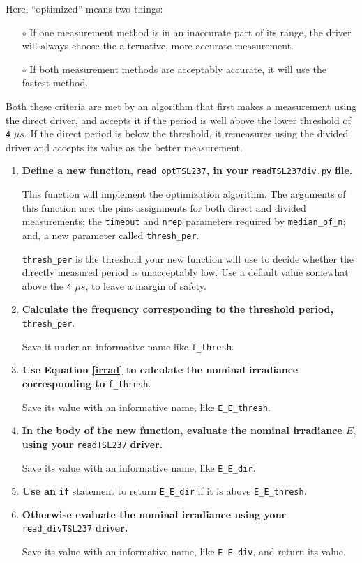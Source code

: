 Here, ``optimized'' means two things:
\begin{itemize}
	\item[$\circ$] If one measurement method is in an inaccurate part of its range, the driver will always choose the alternative, more accurate measurement.
	\item[$\circ$] If both measurement methods are acceptably accurate, it will use the fastest method.
\end{itemize} 
Both these criteria are met by an algorithm that first makes a measurement using the direct driver, and accepts it if the period is well above the lower threshold of \texttt{4} $\mu s$.
If the direct period is below the threshold, it remeasures using the divided driver and accepts its value as the better measurement.
\begin{enumerate}
	\item \textbf{Define a new function,} \lstinline{read_optTSL237}\textbf{, in your} \lstinline{readTSL237div.py} \textbf{file.}
	
	This function will implement the optimization algorithm.
	The arguments of this function are: the pins assignments for both direct and divided measurements; the \lstinline{timeout} and \lstinline{nrep} parameters required by \lstinline{median_of_n}; and, a new parameter called \lstinline{thresh_per}.
	
	\smallskip
	\lstinline{thresh_per} is the threshold your new function will use to decide whether the directly measured period is unacceptably low.
	Use a default value somewhat above the  \texttt{4} $\mu s$, to leave a margin of safety.
	
	\item \textbf{Calculate the frequency corresponding to the threshold period,} \lstinline{thresh_per}.
	
	Save it under an informative name like \lstinline{f_thresh}.

	\item \textbf{Use Equation \ref{irrad} to calculate the nominal irradiance corresponding to} \lstinline{f_thresh}.
	
	Save its value with an informative name, like \lstinline{E_E_thresh}.

	\item \textbf{In the body of the new function, evaluate the nominal irradiance $E_e$ using your} \lstinline{readTSL237} \textbf{driver.}
	
	Save its value with an informative name, like \lstinline{E_E_dir}.
	
	\item \textbf{Use an} \lstinline{if} statement to return \lstinline{E_E_dir} if it is above \lstinline{E_E_thresh}.
	
	\item \textbf{Otherwise evaluate the nominal irradiance using your} \lstinline{read_divTSL237} \textbf{driver.}

	Save its value with an informative name, like \lstinline{E_E_div}, and return its value.	
\end{enumerate}


